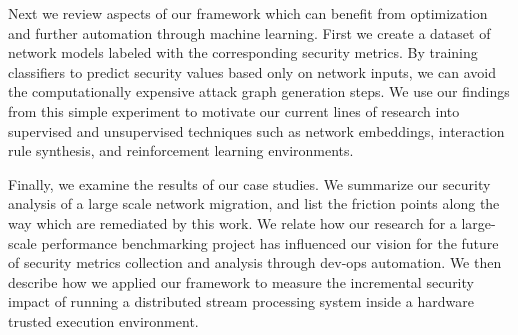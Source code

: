 Next we review aspects of our framework which can benefit from optimization and further automation through machine learning. First we create a dataset of network models labeled with the corresponding security metrics. By training classifiers to predict security values based only on network inputs, we can avoid the computationally expensive attack graph generation steps. We use our findings  from this simple experiment to motivate our current lines of research into supervised and unsupervised techniques such as network embeddings, interaction rule synthesis, and reinforcement learning environments. 

Finally, we examine the results of our case studies. We summarize our security analysis of a large scale network migration, and list the friction points along the way which are remediated by this work. We relate how our research for a  large-scale performance benchmarking project has influenced our vision for the future of security metrics collection and analysis through dev-ops automation. We then describe how we applied our framework to measure the incremental security impact of running a distributed stream processing system inside a hardware trusted execution environment.

